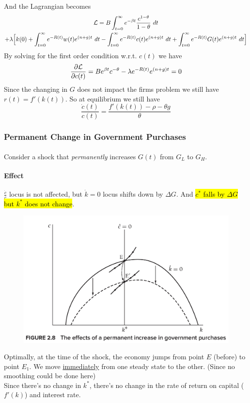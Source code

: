\documentclass[11pt]{article}
\begin{document}
			And the Lagrangian becomes
			\begin{gather}
				\mathcal{{L}} = B \int_{t=0}^\infty e^{-\beta t} \frac{c^{1-\theta}}{1-\theta}\ dt \\
				+ \lambda \Big[ k(0) + \int_{t=0}^\infty e^{-R(t)} w(t) e^{(n+g)t} \ dt - \int_{t=0}^\infty e^{-R(t)} c(t) e^{(n+g)t}\ dt + \int_{t=0}^\infty e^{-R(t)} G(t) e^{(n+g)t}\ dt\Big]
			\end{gather}
			By solving for the first order condition w.r.t. $c(t)$ we have 
			\[
				\frac{\partial{\mathcal{{L}}}}{\partial{c(t)}} = B e^{\beta t} c^{-\theta} - \lambda e^{-R(t)} e^{(n+g)t} = 0
			\]
			Since the changing in $G$ does not impact the firms problem we still have $r(t) = f'(k(t))$.
			So at equilibrium we still have 
			\[
				\frac{\dot{c}(t)}{c(t)} = \frac{f'(k(t)) - \rho - \theta g}{\theta}
			\]
			
			\subsubsection{Permanent Change in Government Purchases}
			\paragraph{}Consider a shock that \emph{permanently} increases $G(t)$ from $G_L$ to $G_H$.
			
			\paragraph{Effect} $\frac{\dot{c}}{c}$ locus is not affected, but $\dot{k}=0$ locus shifts down by $\Delta G$. And \hl{$c^*$ falls by $\Delta G$ but $k^*$ does not change}.
			\begin{figure}[h]
				\centering
				\includegraphics[width=0.8\linewidth]{figures/7_2}
			\end{figure}
			Optimally, at the time of the shock, the economy jumps from point $E$ (before) to point $E_1$. We move \ul{immediately} from one steady state to the other. (Since no smoothing could be done here) \\
			Since there's no change in $k^*$, there's no change in the rate of return on capital ($f'(k)$) and interest rate.
		
\end{document}

